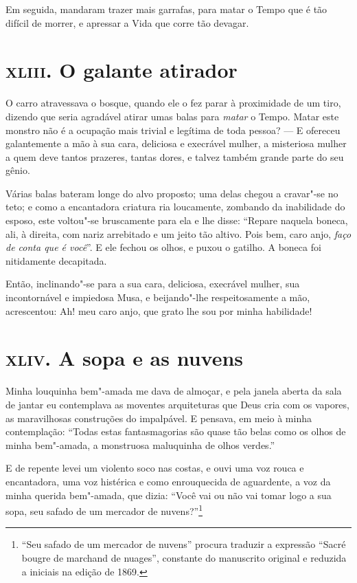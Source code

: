 Em seguida, mandaram trazer mais garrafas, para matar o Tempo que é tão difícil de morrer, e apressar a Vida que corre tão devagar.

\chapter{\textsc{xliii.} O galante atirador}

O carro atravessava o bosque, quando ele o fez parar à proximidade de um
tiro, dizendo que seria agradável atirar umas balas para \textit{matar} o
Tempo. Matar este monstro não é a ocupação mais trivial e legítima de
toda pessoa? --- E ofereceu galantemente a mão à sua cara, deliciosa e
execrável mulher, a misteriosa mulher a quem deve tantos prazeres,
tantas dores, e talvez também grande parte do seu gênio.

Várias balas bateram longe do alvo proposto; uma delas chegou a cravar"-se
no teto; e como a encantadora criatura ria loucamente, zombando da
inabilidade do esposo, este voltou"-se bruscamente para ela e lhe
disse: “Repare naquela boneca, ali, à direita, com
nariz arrebitado e um jeito tão altivo. Pois bem, caro anjo, \textit{faço de
conta que é você}''. E ele fechou os olhos, e puxou o
gatilho. A boneca foi nitidamente decapitada.

Então, inclinando"-se para a sua cara, deliciosa, execrável mulher, sua
incontornável e impiedosa Musa, e beijando"-lhe respeitosamente a mão,
acrescentou: Ah! meu caro anjo, que grato lhe sou por
minha habilidade!

\chapter{\textsc{xliv.} A sopa e as nuvens}

Minha louquinha bem"-amada me dava de almoçar, e pela janela aberta da
sala de jantar eu contemplava as moventes arquiteturas que Deus cria com
os vapores, as maravilhosas construções do impalpável. E pensava,
em meio à minha contemplação: “Todas estas
fantasmagorias são quase tão belas como os olhos de minha
bem"-amada, a monstruosa maluquinha de olhos verdes.”

E de repente levei um violento soco nas costas, e ouvi uma voz rouca e
encantadora, uma voz histérica e como enrouquecida de aguardente,
a voz da minha querida bem"-amada, que dizia: “Você
vai ou não vai tomar logo a sua sopa, seu safado de um mercador de
nuvens?''\footnote{ “Seu safado de um mercador de nuvens'' 
procura traduzir a expressão “Sacré bougre de marchand de
nuages'', constante do manuscrito original e reduzida a
iniciais na edição de 1869.}

